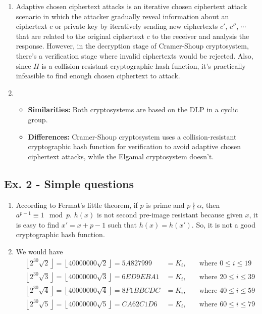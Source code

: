 \documentclass[11pt,a4paper]{article}
\begin{document}
\begin{enumerate}
\item Adaptive chosen ciphertext attacks is an iterative chosen ciphertext attack scenario in which the attacker gradually reveal information about an ciphertext $c$ or private key by iteratively sending new ciphertexts $c'$, $c''$, $\cdots$ that are related to the original ciphertext $c$ to the receiver and analysis the response. However, in the decryption stage of Cramer-Shoup cryptosystem, there's a verification stage where invalid ciphertexts would be rejected. Also, since $H$ is a collision-resistant cryptographic hash function, it's practically infeasible to find enough chosen ciphertext to attack.

\item \begin{itemize}
	\item \textbf{Similarities:} Both cryptosystems are based on the DLP in a cyclic group.
	
	\item \textbf{Differences:} Cramer-Shoup cryptosystem uses a collision-resistant cryptographic hash function for verification to avoid adaptive chosen ciphertext attacks, while the Elgamal cryptosystem doesn't.
	\end{itemize}
\end{enumerate}



\subsection*{Ex. 2 - Simple questions}
\begin{enumerate}
\item According to Fermat's little theorem, if $p$ is prime and $p \nmid \alpha$, then $a^{p-1} \equiv 1 \mod p$. $h(x)$ is not second pre-image resistant because given $x$, it is easy to find $x' = x + p - 1$ such that $h(x) = h(x')$. So, it is not a good cryptographic hash function.

\item We would have
	\begin{align*}
	&\left\lfloor 2^{30}\sqrt{2} \right\rfloor = \left\lfloor 40000000‬\sqrt{2} \right\rfloor = 5A827999 &= K_{i}, \quad &\mbox{where } 0 \leq i \leq 19 \\
	&\left\lfloor 2^{30}\sqrt{3} \right\rfloor = \left\lfloor 40000000‬\sqrt{3} \right\rfloor = 6ED9EBA1 &= K_{i}, \quad &\mbox{where } 20 \leq i \leq 39 \\
	&\left\lfloor 2^{30}\sqrt{4} \right\rfloor = \left\lfloor 40000000‬\sqrt{4} \right\rfloor = 8F1BBCDC &= K_{i}, \quad &\mbox{where } 40 \leq i \leq 59 \\
	&\left\lfloor 2^{30}\sqrt{5} \right\rfloor = \left\lfloor 40000000‬\sqrt{5} \right\rfloor = CA62C1D6 &= K_{i}, \quad &\mbox{where } 60 \leq i \leq 79
	\end{align*}
\end{enumerate}
\end{document}
